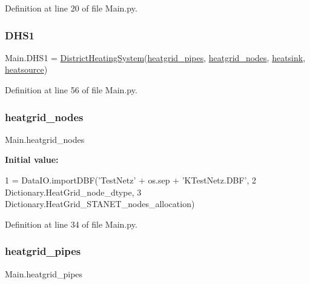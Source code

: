 Definition at line 20 of file Main.\+py.

\mbox{\label{namespace_main_ae4535ead940864814690c97070dd4438}} 
\subsubsection{\texorpdfstring{D\+H\+S1}{DHS1}}
{\footnotesize\ttfamily Main.\+D\+H\+S1 = \hyperlink{class_district_heating_system_1_1_district_heating_system}{District\+Heating\+System}(\hyperlink{namespace_main_aae2f2616b49aa0f1f27a99ce2525470f}{heatgrid\+\_\+pipes}, \hyperlink{namespace_main_a00b04001dec555db32f5905617e3b61f}{heatgrid\+\_\+nodes}, \hyperlink{namespace_main_a26af29b8548cf87e8d31234213cde312}{heatsink}, \hyperlink{namespace_main_a1dbfe33a196057c1fc788403424dea4c}{heatsource})}



Definition at line 56 of file Main.\+py.

\mbox{\label{namespace_main_a00b04001dec555db32f5905617e3b61f}} 
\subsubsection{\texorpdfstring{heatgrid\+\_\+nodes}{heatgrid\_nodes}}
{\footnotesize\ttfamily Main.\+heatgrid\+\_\+nodes}

{\bfseries Initial value\+:}
\begin{DoxyCode}
1 =  DataIO.importDBF(\textcolor{stringliteral}{'TestNetz'} + os.sep + \textcolor{stringliteral}{'KTestNetz.DBF'},
2                                   Dictionary.HeatGrid\_node\_dtype,
3                                   Dictionary.HeatGrid\_STANET\_nodes\_allocation)
\end{DoxyCode}


Definition at line 34 of file Main.\+py.

\mbox{\label{namespace_main_aae2f2616b49aa0f1f27a99ce2525470f}} 
\subsubsection{\texorpdfstring{heatgrid\+\_\+pipes}{heatgrid\_pipes}}
{\footnotesize\ttfamily Main.\+heatgrid\+\_\+pipes}

